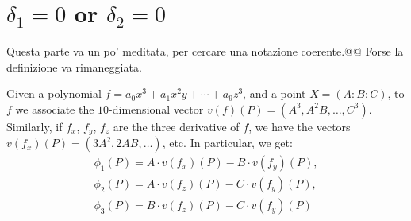\documentclass[11pt, a4paper, reqno, captions=tableheading,bibliography=totoc]{scrartcl}
\theoremstyle{plain}
\theoremstyle{definition}
\begin{document}
\section{$\delta_1=0$ or $\delta_2=0$}

Questa parte va un po' meditata, per cercare una notazione coerente.@@
Forse la definizione  va rimaneggiata.

Given a polynomial $f = a_0x^3+a_1x^2y+\cdots+ a_9z^3$, and a point
$X = (A: B: C)$, to $f$ we associate the $10$-dimensional vector
$v(f)(P) = (A^3, A^2B, \dots, C^3)$. Similarly, if $f_x$, $f_y$, $f_z$ are
the three derivative of $f$, we have the vectors
$v(f_x)(P) = (3A^2, 2AB, \dots )$, etc.
In particular, we get:
\begin{gather*}
\phi_1(P) = A\cdot v(f_x)(P)-B\cdot v(f_y)(P), \\
\phi_2(P) = A\cdot v(f_z)(P)-C\cdot v(f_y)(P),\\
\phi_3(P) = B\cdot v(f_z)(P)-C\cdot v(f_y)(P) 
\end{gather*}


\bigskip
\bigskip
\end{document}
